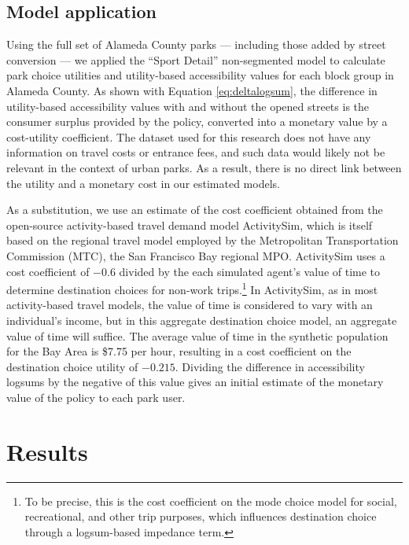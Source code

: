 \documentclass[3p, authoryear, review]{elsarticle} %
\begin{document}
\hypertarget{model-application}{%
\subsection{Model application}\label{model-application}}

Using the full set of Alameda County parks --- including those added by street conversion --- we applied the ``Sport Detail'' non-segmented model to calculate park choice utilities and utility-based accessibility values for each block group in Alameda County. As shown with Equation \eqref{eq:deltalogsum}, the difference in utility-based accessibility values with and without the opened streets is the consumer surplus provided by the policy, converted into a monetary value by a cost-utility coefficient. The dataset used for this research does not have any information on travel costs or entrance fees, and such data would likely not be relevant in the context of urban parks. As a result, there is no direct link between the utility and a monetary cost in our estimated models.

As a substitution, we use an estimate of the cost coefficient obtained from the open-source activity-based travel demand model ActivitySim, which is itself based on the regional travel model employed by the Metropolitan Transportation Commission (MTC), the San Francisco Bay regional MPO. ActivitySim uses a cost coefficient of \(-0.6\) divided by the each simulated agent's value of time to determine destination choices for non-work trips.\footnote{To be precise, this is the cost coefficient on the mode choice model for social, recreational, and other trip purposes, which influences destination choice through a logsum-based impedance term.} In ActivitySim, as in most activity-based travel models, the value of time is considered to vary with an individual's income, but in this aggregate destination choice model, an aggregate value of time will suffice. The average value of time in the synthetic population for the Bay Area is \$7.75 per hour, resulting in a cost coefficient on the destination choice utility of \(-0.215\). Dividing the difference in accessibility logsums by the negative of this value gives an initial estimate of the monetary value of the policy to each park user.

\hypertarget{results}{%
\section{Results}\label{results}}
\end{document}
